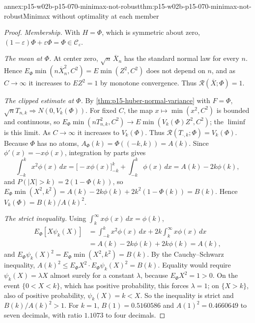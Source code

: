 \begin{annexitem}{annex:p15-w02b-p15-070-minimax-not-robust}{thm:p15-w02b-p15-070-minimax-not-robust}{Minimax without optimality at each member}
\begin{proof}
\emph{Membership.} With \(H=\Phi\), which is symmetric about zero,
\((1-\varepsilon)\Phi+\varepsilon\Phi=\Phi\in\mathcal C_\varepsilon\).

\emph{The mean at \(\Phi\).} At center zero,
\(\sqrt n\,\overline X_n\) has the standard normal law for every \(n\).
Hence \(E_\Phi\min(n\overline X_n^2,C^2)=E\min(Z^2,C^2)\) does not
depend on \(n\), and as \(C\to\infty\) it increases to \(EZ^2=1\) by
monotone convergence. Thus \(\mathcal R(\overline X;\Phi)=1\).

\emph{The clipped estimate at \(\Phi\).} By
\cref{thm:p15-huber-normal-variance} with \(F=\Phi\),
\(\sqrt nT_{n,k}\Rightarrow N(0,V_k(\Phi))\). For fixed \(C\), the map
\(x\mapsto\min(x^2,C^2)\) is bounded and continuous, so
\(E_\Phi\min(nT_{n,k}^2,C^2)\to E\min(V_k(\Phi)Z^2,C^2)\); the
\(\liminf\) is this limit. As \(C\to\infty\) it increases to
\(V_k(\Phi)\). Thus \(\mathcal R(T_{\cdot,k};\Phi)=V_k(\Phi)\).
Because \(\Phi\) has no atoms, \(A_\Phi(k)=\Phi((-k,k))=A(k)\). Since
\(\phi'(x)=-x\phi(x)\), integration by parts gives
\[
 \int_{-k}^kx^2\phi(x)\,dx=\bigl[-x\phi(x)\bigr]_{-k}^{k}
 +\int_{-k}^k\phi(x)\,dx=A(k)-2k\phi(k),
\]
and \(P(|X|>k)=2(1-\Phi(k))\), so
\(E_\Phi\min(X^2,k^2)=A(k)-2k\phi(k)+2k^2(1-\Phi(k))=B(k)\). Hence
\(V_k(\Phi)=B(k)/A(k)^2\).

\emph{The strict inequality.} Using \(\int_k^\infty x\phi(x)\,dx=\phi(k)\),
\[
\begin{aligned}
 E_\Phi[X\psi_k(X)]&=\int_{-k}^kx^2\phi(x)\,dx+2k\int_k^\infty x\phi(x)\,dx\\
 &=A(k)-2k\phi(k)+2k\phi(k)=A(k),
\end{aligned}
\]
and \(E_\Phi\psi_k(X)^2=E_\Phi\min(X^2,k^2)=B(k)\). By the
Cauchy--Schwarz inequality,
\(A(k)^2\leq E_\Phi X^2\cdot E_\Phi\psi_k(X)^2=B(k)\). Equality would
require \(\psi_k(X)=\lambda X\) almost surely for a constant \(\lambda\),
because \(E_\Phi X^2=1>0\). On the event \(\{0<X<k\}\), which has positive
probability, this forces \(\lambda=1\); on \(\{X>k\}\), also of positive
probability, \(\psi_k(X)=k<X\). So the inequality is strict and
\(B(k)/A(k)^2>1\). For \(k=1\), \(B(1)=0.5160586\) and
\(A(1)^2=0.4660649\) to seven decimals, with ratio \(1.1073\) to four
decimals.


\end{proof}
\end{annexitem}

